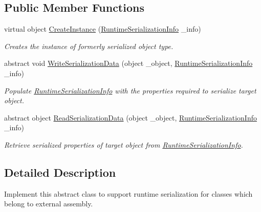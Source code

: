 \subsection*{Public Member Functions}
\begin{DoxyCompactItemize}
\item 
virtual object \hyperlink{class_voxel_busters_1_1_runtime_serialization_1_1_i_runtime_serializable_extension_aea67c59932ae24c6450076bb18922203}{Create\+Instance} (\hyperlink{class_voxel_busters_1_1_runtime_serialization_1_1_runtime_serialization_info}{Runtime\+Serialization\+Info} \+\_\+info)
\begin{DoxyCompactList}\small\item\em Creates the instance of formerly serialized object type. \end{DoxyCompactList}\item 
abstract void \hyperlink{class_voxel_busters_1_1_runtime_serialization_1_1_i_runtime_serializable_extension_a7a099234ce249b9f9bc5b5edf4cc06f4}{Write\+Serialization\+Data} (object \+\_\+object, \hyperlink{class_voxel_busters_1_1_runtime_serialization_1_1_runtime_serialization_info}{Runtime\+Serialization\+Info} \+\_\+info)
\begin{DoxyCompactList}\small\item\em Populate \hyperlink{class_voxel_busters_1_1_runtime_serialization_1_1_runtime_serialization_info}{Runtime\+Serialization\+Info} with the properties required to serialize target object. \end{DoxyCompactList}\item 
abstract object \hyperlink{class_voxel_busters_1_1_runtime_serialization_1_1_i_runtime_serializable_extension_a08e596bb7a55206077e4dc389baaf131}{Read\+Serialization\+Data} (object \+\_\+object, \hyperlink{class_voxel_busters_1_1_runtime_serialization_1_1_runtime_serialization_info}{Runtime\+Serialization\+Info} \+\_\+info)
\begin{DoxyCompactList}\small\item\em Retrieve serialized properties of target object from \hyperlink{class_voxel_busters_1_1_runtime_serialization_1_1_runtime_serialization_info}{Runtime\+Serialization\+Info}. \end{DoxyCompactList}\end{DoxyCompactItemize}


\subsection{Detailed Description}
Implement this abstract class to support runtime serialization for classes which belong to external assembly. 



